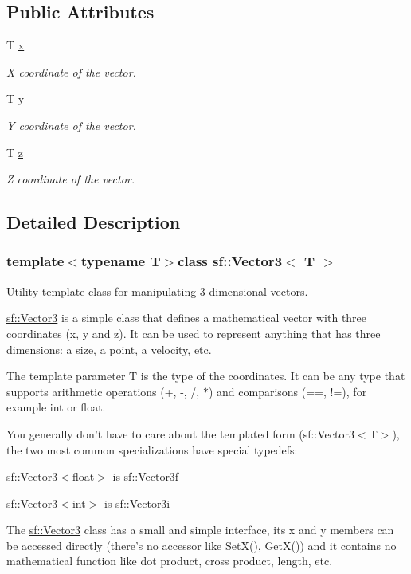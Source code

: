 \subsection*{Public Attributes}
\begin{DoxyCompactItemize}
\item 
T \hyperlink{classsf_1_1_vector3_a3cb0c769390bc37c346bb1a69e510d16}{x}
\begin{DoxyCompactList}\small\item\em X coordinate of the vector. \end{DoxyCompactList}\item 
T \hyperlink{classsf_1_1_vector3_a6590d50ccb862c5efc5512e974e9b794}{y}
\begin{DoxyCompactList}\small\item\em Y coordinate of the vector. \end{DoxyCompactList}\item 
T \hyperlink{classsf_1_1_vector3_a2f36ab4b552c028e3a9734c1ad4df7d1}{z}
\begin{DoxyCompactList}\small\item\em Z coordinate of the vector. \end{DoxyCompactList}\end{DoxyCompactItemize}


\subsection{Detailed Description}
\subsubsection*{template$<$typename T$>$class sf\-::\-Vector3$<$ T $>$}

Utility template class for manipulating 3-\/dimensional vectors. 

\hyperlink{classsf_1_1_vector3}{sf\-::\-Vector3} is a simple class that defines a mathematical vector with three coordinates (x, y and z). It can be used to represent anything that has three dimensions\-: a size, a point, a velocity, etc.

The template parameter T is the type of the coordinates. It can be any type that supports arithmetic operations (+, -\/, /, $\ast$) and comparisons (==, !=), for example int or float.

You generally don't have to care about the templated form (sf\-::\-Vector3$<$\-T$>$), the two most common specializations have special typedefs\-: \begin{DoxyItemize}
\item sf\-::\-Vector3$<$float$>$ is \hyperlink{namespacesf_af97357d7d32e7d6a700d03be2f3b4811}{sf\-::\-Vector3f} \item sf\-::\-Vector3$<$int$>$ is \hyperlink{namespacesf_ad066a8774efaf7b623df8909ba219dc7}{sf\-::\-Vector3i}\end{DoxyItemize}
The \hyperlink{classsf_1_1_vector3}{sf\-::\-Vector3} class has a small and simple interface, its x and y members can be accessed directly (there's no accessor like Set\-X(), Get\-X()) and it contains no mathematical function like dot product, cross product, length, etc.

